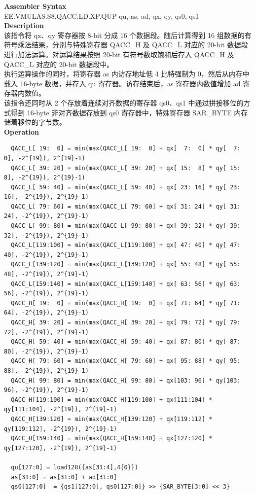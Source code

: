 \textbf{Assembler Syntax} \\
EE.VMULAS.S8.QACC.LD.XP.QUP qu, as, ad, qx, qy, qs0, qs1 \\
\textbf{Description} \\
该指令将 qx、qy 寄存器按 8-bit 分成 16 个数据段。随后计算得到 16 组数据的有符号乘法结果，分别与特殊寄存器 QACC\_H 及 QACC\_L 对应的 20-bit 数据段进行加法运算。对运算结果按照 20-bit 有符号数取饱和后存入 QACC\_H 及 QACC\_L 对应的 20-bit 数据段中。\\
执行运算操作的同时，将寄存器 as 内访存地址低 4 比特强制为 0，然后从内存中载入 16-byte 数据，并存入 qu 寄存器。访存结束后，as 寄存器内数值增加 ad 寄存器内数值。\\
该指令还同时从 2 个存放着连续对齐数据的寄存器 qs0、qs1 中通过拼接移位的方式得到 16-byte 非对齐数据存放到 qs0 寄存器中，特殊寄存器 SAR\_BYTE 内存储着移位的字节数。\\
\textbf{Operation}
\begin{lstlisting}
  QACC_L[ 19:  0] = min(max(QACC_L[ 19:  0] + qx[  7:  0] * qy[  7:  0], -2^{19}), 2^{19}-1)
  QACC_L[ 39: 20] = min(max(QACC_L[ 39: 20] + qx[ 15:  8] * qy[ 15:  8], -2^{19}), 2^{19}-1)
  QACC_L[ 59: 40] = min(max(QACC_L[ 59: 40] + qx[ 23: 16] * qy[ 23: 16], -2^{19}), 2^{19}-1)
  QACC_L[ 79: 60] = min(max(QACC_L[ 79: 60] + qx[ 31: 24] * qy[ 31: 24], -2^{19}), 2^{19}-1)
  QACC_L[ 99: 80] = min(max(QACC_L[ 99: 80] + qx[ 39: 32] * qy[ 39: 32], -2^{19}), 2^{19}-1)
  QACC_L[119:100] = min(max(QACC_L[119:100] + qx[ 47: 40] * qy[ 47: 40], -2^{19}), 2^{19}-1)
  QACC_L[139:120] = min(max(QACC_L[139:120] + qx[ 55: 48] * qy[ 55: 48], -2^{19}), 2^{19}-1)
  QACC_L[159:140] = min(max(QACC_L[159:140] + qx[ 63: 56] * qy[ 63: 56], -2^{19}), 2^{19}-1)
  QACC_H[ 19:  0] = min(max(QACC_H[ 19:  0] + qx[ 71: 64] * qy[ 71: 64], -2^{19}), 2^{19}-1)
  QACC_H[ 39: 20] = min(max(QACC_H[ 39: 20] + qx[ 79: 72] * qy[ 79: 72], -2^{19}), 2^{19}-1)
  QACC_H[ 59: 40] = min(max(QACC_H[ 59: 40] + qx[ 87: 80] * qy[ 87: 80], -2^{19}), 2^{19}-1)
  QACC_H[ 79: 60] = min(max(QACC_H[ 79: 60] + qx[ 95: 88] * qy[ 95: 88], -2^{19}), 2^{19}-1)
  QACC_H[ 99: 80] = min(max(QACC_H[ 99: 80] + qx[103: 96] * qy[103: 96], -2^{19}), 2^{19}-1)
  QACC_H[119:100] = min(max(QACC_H[119:100] + qx[111:104] * qy[111:104], -2^{19}), 2^{19}-1)
  QACC_H[139:120] = min(max(QACC_H[139:120] + qx[119:112] * qy[119:112], -2^{19}), 2^{19}-1)
  QACC_H[159:140] = min(max(QACC_H[159:140] + qx[127:120] * qy[127:120], -2^{19}), 2^{19}-1)

  qu[127:0] = load128({as[31:4],4{0}})
  as[31:0] = as[31:0] + ad[31:0]
  qs0[127:0]  = {qs1[127:0], qs0[127:0]} >> {SAR_BYTE[3:0] << 3}
\end{lstlisting}

